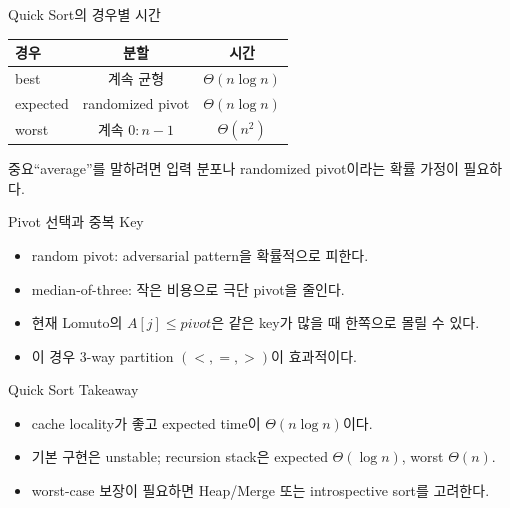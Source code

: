 \begin{frame}{Quick Sort의 경우별 시간}
\begin{tabular}{lcc}\toprule 경우&분할&시간\\\midrule best&계속 균형&$\Theta(n\log n)$\\expected&randomized pivot&$\Theta(n\log n)$\\worst&계속 $0:n-1$&$\Theta(n^2)$\\\bottomrule\end{tabular}
\vspace{4mm}\begin{block}{중요}“average”를 말하려면 입력 분포나 randomized pivot이라는 확률 가정이 필요하다.\end{block}
\end{frame}
\begin{frame}{Pivot 선택과 중복 Key}
\optional[선택 심화]\hfill
\begin{itemize}\item random pivot: adversarial pattern을 확률적으로 피한다.\item median-of-three: 작은 비용으로 극단 pivot을 줄인다.\item 현재 Lomuto의 $A[j]\le pivot$은 같은 key가 많을 때 한쪽으로 몰릴 수 있다.\item 이 경우 3-way partition $(<,=,>)$이 효과적이다.\end{itemize}
\end{frame}
\begin{frame}{Quick Sort Takeaway}
\begin{itemize}\item cache locality가 좋고 expected time이 $\Theta(n\log n)$이다.\item 기본 구현은 unstable; recursion stack은 expected $\Theta(\log n)$, worst $\Theta(n)$.\item worst-case 보장이 필요하면 Heap/Merge 또는 introspective sort를 고려한다.\end{itemize}
\end{frame}

